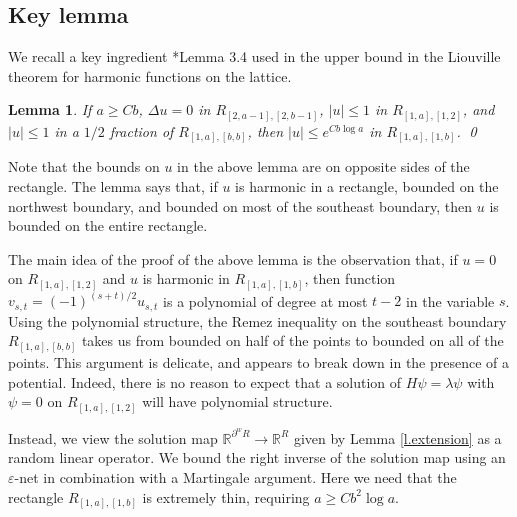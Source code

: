 \documentclass{amsart}
\newtheorem{lemma}[equation]{Lemma}
\newcommand{\lref}[1]{Lemma \ref{l.#1}}
\numberwithin{equation}{section}
\numberwithin{figure}{section}
\newcommand{\R}{\mathbb{R}}
\newcommand{\ep}{\varepsilon}
\begin{document}
\subsection{Key lemma}

We recall a key ingredient \cite{Buhovsky-Logunov-Malinnikova-Sodin}*{Lemma 3.4} used in the upper bound in the Liouville theorem for harmonic functions on the lattice. 

\begin{lemma}
If $a \geq C b$, $\Delta u = 0$ in $R_{[2,a-1],[2,b-1]}$, $|u| \leq 1$ in $R_{[1,a],[1,2]}$, and $|u| \leq 1$ in a $1/2$ fraction of $R_{[1,a],[b,b]}$, then $|u| \leq e^{C b \log a}$ in $R_{[1,a],[1,b]}$. \qed
\end{lemma}

Note that the bounds on $u$ in the above lemma are on opposite sides of the rectangle.  The lemma says that, if $u$ is harmonic in a rectangle, bounded on the northwest boundary, and bounded on most of the southeast boundary, then $u$ is bounded on the entire rectangle.

The main idea of the proof of the above lemma is the observation that, if $u = 0$ on $R_{[1,a],[1,2]}$ and $u$ is harmonic in $R_{[1,a],[1,b]}$, then function $v_{s,t} = (-1)^{(s+t)/2} u_{s,t}$ is a polynomial of degree at most $t - 2$ in the variable $s$.  Using the polynomial structure, the Remez inequality \cite{Bojanov} on the southeast boundary $R_{[1,a],[b,b]}$ takes us from bounded on half of the points to bounded on all of the points.  This argument is delicate, and appears to break down in the presence of a potential.  Indeed, there is no reason to expect that a solution of $H \psi = \lambda \psi$ with $\psi = 0$ on $R_{[1,a],[1,2]}$ will have polynomial structure.

Instead, we view the solution map $\R^{\partial^w R} \to \R^{R}$ given by \lref{extension} as a random linear operator.  We bound the right inverse of the solution map using an $\ep$-net in combination with a Martingale argument.  Here we need that the rectangle $R_{[1,a],[1,b]}$ is extremely thin, requiring $a \geq C b^2 \log a$.
\end{document}
